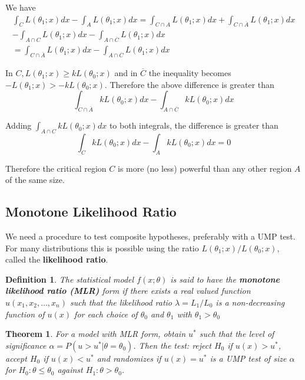 \documentclass{article}
\newtheorem{definition}{Definition}[section]
\newtheorem{theorem}{Theorem}[section]
\begin{document}
We have
 \begin{equation*}
 \begin{split}
     \int_C L(\theta_1;x) dx - \int_A L(\theta_1;x) dx = \int_{C \cap A} L(\theta_1;x) dx + \int_{C \cap \overline{A}} L(\theta_1;x) dx \\
     - \int_{A \cap C} L(\theta_1;x) dx - \int_{A \cap \overline{C}} L(\theta_1;x) dx \\
     = \int_{C \cap \overline{A}} L(\theta_1;x) dx -\int_{A \cap \overline{C}} L(\theta_1;x) dx
\end{split}     
\end{equation*}

In \(C, L(\theta_1;x) \geq k L(\theta_0;x)\) and in \(\overline{C}\) the inequality becomes \(-L(\theta_1;x) > - kL(\theta_0;x)\). Therefore the above difference is greater than
\begin{equation*}
    \int_{C \cap \overline{A}} kL(\theta_0;x)dx-\int_{A \cap \overline{C} } kL(\theta_0;x) dx
\end{equation*}

Adding \(\int_{A \cap C}kL(\theta_0;x) dx \) to both integrals, the difference is greater than
\begin{equation*}
    \int_C kL(\theta_0;x) dx - \int_A kL(\theta_0;x)dx=0
\end{equation*}

Therefore the critical region \(C\) is more (no less) powerful than any other region \(A\) of the same size. 

\subsection{Monotone Likelihood Ratio}

We need a procedure to test composite hypotheses, preferably with a UMP test. For many distributions this is possible using the ratio \(L(\theta_1;x)/L(\theta_0;x)\), called the \textbf{likelihood ratio}.

\begin{definition}
    The statistical model \(f(x;\theta)\) is said to have the \textbf{monotone likelihood ratio (MLR)} form if there exists a real valued function \(u(x_1,x_2,\dots,x_n)\) such that the likelihood ratio \(\lambda = L_1/L_0\) is a non-decreasing function of \(u(x)\) for each choice of \(\theta_0\) and \(\theta_1\) with \(\theta_1 > \theta_0\)
\end{definition}

\begin{theorem}
    For a model with MLR form, obtain \(u^*\) such that the level of significance \(\alpha=P(u>u^*|\theta=\theta_0)\). Then the test: reject \(H_0\) if \(u(x)>u^*\), accept \(H_0\) if \(u(x)<u^*\) and randomizes if \(u(x)=u^*\) is a UMP test of size \(\alpha\) for \(H_0:\theta \leq \theta_0\) against \(H_1:\theta > \theta_0\).
\end{theorem}
\end{document}
